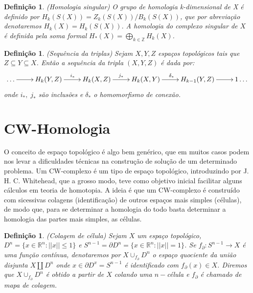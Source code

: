 \documentclass[12pt]{book}
\newtheorem{definicao}[teorema]{Definição}
\newcommand{\homologiarel}[3]{H_{#1}(#2,#3)}
\begin{document}
	\begin{definicao}
		(Homologia singular) O grupo de homologia k-dimensional de X é definido por $H_{k}(S(X)) = Z_{k}(S(X))/B_{k}(S(X))$, que por abreviação denotaremos $H_{k}(X)=H_{k}(S(X))$. A homologia do complexo singular de $X$ é definida pela soma formal $H_{*}(X) = \bigoplus_{k \in \mathbb{Z}}H_{k}(X)$.
	\end{definicao}
	
	\begin{definicao}
		(Sequência da triplas) Sejam $X, Y, Z$ espaços topológicos tais que $Z \subseteq Y \subseteq X$. Então a sequência da tripla $(X,Y,Z)$ é dada por:
		$$
		\xymatrix{
				\dots \ar[r] & \homologiarel{k}{Y}{Z} \ar[r]^{i_{*}} & \homologiarel{k}{X}{Z} \ar[r]^{j_{*}} & \homologiarel{k}{X}{Y} \ar[r]^{\delta_{*}} & \homologiarel{k-1}{Y}{Z} \ar[r] & 1\dots
		}
		$$
		onde $i_{*},\;j_{*}$ são inclusões e $\delta_{*}$ o homomorfismo de conexão.
	\end{definicao}
	
	\section{CW-Homologia}
	O conceito de espaço topológico é algo bem genérico, que em muitos casos podem nos levar a dificuldades técnicas na construção de solução de um determinado problema. Um CW-complexo é um tipo de espaço topológico, introduzindo por J. H. C. Whitehead, que a grosso modo, teve como objetivo inicial facilitar alguns cálculos em teoria de homotopia. A ideia é que um CW-complexo é construído com sicessivas colagens (identificação) de outros espaços mais simples (células), de modo que, para se determinar a homologia do todo basta determinar a homologia das partes mais simples, as células.
	\begin{definicao}
		(Colagem de célula) Sejam $X$ um espaço topológico, $D^{n}=\{x\in \mathbb{R}^{n} : ||x|| \leq 1\}$ e $S^{n-1} = \partial D^{n}=\{x\in \mathbb{R}^{n} : ||x|| = 1\}$. Se $f_{\partial}:S^{n-1} \to X$ é uma função contínua, denotaremos por $X\cup_{f_{\partial}}D^{n}$ o espaço quociente da união disjunta $X \coprod D^{n}$ onde $x \in \partial D^{x} = S^{n-1}$ é identificado com $f_{\partial}(x) \in X$. Diremos que $X\cup_{f_{\partial}}D^{n}$ é obtido a partir de $X$ colando uma $n-$célula e $f_{\partial}$ é chamado de mapa de colagem.
 	\end{definicao}
	
\end{document}

